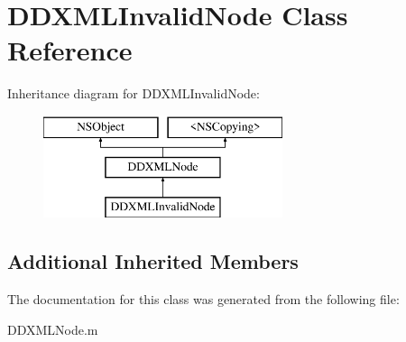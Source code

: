 \hypertarget{class_d_d_x_m_l_invalid_node}{}\section{D\+D\+X\+M\+L\+Invalid\+Node Class Reference}
\label{class_d_d_x_m_l_invalid_node}
Inheritance diagram for D\+D\+X\+M\+L\+Invalid\+Node\+:\begin{figure}[H]
\begin{center}
\leavevmode
\includegraphics[height=3.000000cm]{class_d_d_x_m_l_invalid_node}
\end{center}
\end{figure}
\subsection*{Additional Inherited Members}


The documentation for this class was generated from the following file\+:\begin{DoxyCompactItemize}
\item 
D\+D\+X\+M\+L\+Node.\+m\end{DoxyCompactItemize}
